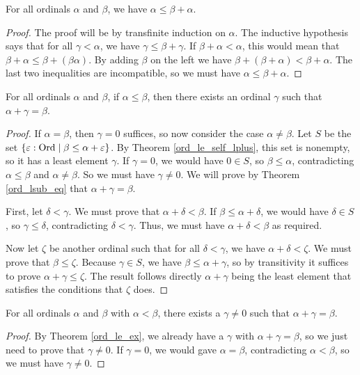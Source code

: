 \documentclass[../../math.tex]{subfiles}
\begin{document}
\begin{theorem} \label{ord_le_self_lplus}
    For all ordinals $\alpha$ and $\beta$, we have $\alpha \leq \beta + \alpha$.
\end{theorem}
\begin{proof}
    The proof will be by transfinite induction on $\alpha$.  The inductive
    hypothesis says that for all $\gamma < \alpha$, we have $\gamma \leq \beta +
    \gamma$.  If $\beta + \alpha < \alpha$, this would mean that $\beta + \alpha
    \leq \beta + (\beta \alpha)$.  By adding $\beta$ on the left we have $\beta
    + (\beta + \alpha) < \beta + \alpha$.  The last two inequalities are
    incompatible, so we must have $\alpha \leq \beta + \alpha$.
\end{proof}

\begin{theorem} \label{ord_le_ex}
    For all ordinals $\alpha$ and $\beta$, if $\alpha \leq \beta$, then there
    exists an ordinal $\gamma$ such that $\alpha + \gamma = \beta$.
\end{theorem}
\begin{proof}
    If $\alpha = \beta$, then $\gamma = 0$ suffices, so now consider the case
    $\alpha \neq \beta$.  Let $S$ be the set $\{\varepsilon : \operatorname{Ord} \mid \beta
    \leq \alpha + \varepsilon\}$.  By Theorem \ref{ord_le_self_lplus}, this set
    is nonempty, so it has a least element $\gamma$.  If $\gamma = 0$, we would
    have $0 \in S$, so $\beta \leq \alpha$, contradicting $\alpha \leq \beta$
    and $\alpha \neq \beta$.  So we must have $\gamma \neq 0$.  We will prove by
    Theorem \ref{ord_lsub_eq} that $\alpha + \gamma = \beta$.

    First, let $\delta < \gamma$.  We must prove that $\alpha + \delta < \beta$.
    If $\beta \leq \alpha + \delta$, we would have $\delta \in S$, so $\gamma
    \leq \delta$, contradicting $\delta < \gamma$.  Thus, we must have $\alpha +
    \delta < \beta$ as required.

    Now let $\zeta$ be another ordinal such that for all $\delta < \gamma$, we
    have $\alpha + \delta < \zeta$.  We must prove that $\beta \leq \zeta$.
    Because $\gamma \in S$, we have $\beta \leq \alpha + \gamma$, so by
    transitivity it suffices to prove $\alpha + \gamma \leq \zeta$.  The result
    follows directly $\alpha + \gamma$ being the least element that satisfies
    the conditions that $\zeta$ does.
\end{proof}

\begin{theorem} \label{ord_lt_ex}
    For all ordinals $\alpha$ and $\beta$ with $\alpha < \beta$, there exists a
    $\gamma \neq 0$ such that $\alpha + \gamma = \beta$.
\end{theorem}
\begin{proof}
    By Theorem \ref{ord_le_ex}, we already have a $\gamma$ with $\alpha + \gamma
    = \beta$, so we just need to prove that $\gamma \neq 0$.  If $\gamma = 0$,
    we would gave $\alpha = \beta$, contradicting $\alpha < \beta$, so we must
    have $\gamma \neq 0$.
\end{proof}
\end{document}
